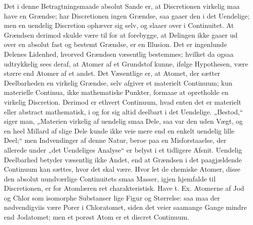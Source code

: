 \documentclass[12pt,a4paper]{book}
\begin{document}
Det i denne Betragtningsmaade absolut Sande er, at
Discretionen virkelig maa have en Grændse; har Discretionen
ingen Grændse, saa gaaer den i det Uendelige; men en
uendelig Discretion ophæver sig selv, og slaaer over i
Continuitet. At Grændsen derimod skulde være til for at
forebygge, at Delingen ikke gaaer ud over en absolut fast og
bestemt Grændse, er en Illusion. Det er ingenlunde Delenes
Lidenhed, hvorved Grændsen væsentlig bestemmes; hvilket da
ogsaa udtrykkelig sees deraf, at Atomer af et Grundstof
kunne, ifølge Hypothesen, være større end Atomer af et andet.
Det Væsentlige er, at Atomet, der sætter Deelbarheden en
virkelig Grændse, selv afgiver et materielt Continuum; kun
materielle Continua, ikke mathematiske Punkter, formaae at
opretholde en virkelig Discretion. Derimod er ethvert
Continuum, hvad enten det er materielt eller abstract
mathematisk, i og for sig altid deelbart i det Uendelige. „Bestod,“
siger man, „Materien virkelig af uendelig smaa Dele, saa
var den uden Vægt, og en heel Millard af slige Dele kunde
ikke veie mere end en enkelt uendelig lille Deel;“ men
Indvendinger af denne Natur, beroe paa en Misforstaaelse, der
allerede under „det Uendeliges Analyse“ er belyst i et
tidligere Afsnit. Uendelig Deelbarhed betyder væsentlig ikke
Andet, end at Grændsen i det paagjældende Continuum kan
sættes, hvor det skal være. Hvor let de chemiske Atomer,
disse den absolut uundværlige Continuitets smaa Masser, igjen
hjemfalde til Discretionen, er for Atomlæren ret charakteristisk.
Have t. Ex. Atomerne af Jod og Chlor som isomorphe
Substanser lige Figur og Størrelse: saa maa der
nødvendigviis være Porer i Chloratomet, siden det veier saamange
Gange mindre end Jodatomet; men et porøst Atom er et
discret Continuum.
\end{document}
